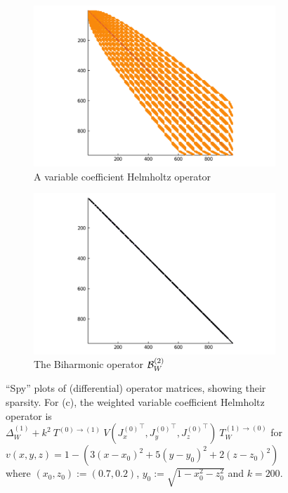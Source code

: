 \documentclass[11pt, oneside]{article}   	%
\begin{document}
\begin{figure}[t]
	\medskip
	\begin{subfigure}{0.45\textwidth}
		\includegraphics[scale=0.3]{sparsity-of-helmholtz}
		\centering
		\caption{A variable coefficient Helmholtz operator}
	\end{subfigure}\hfil %
	\begin{subfigure}{0.45\textwidth}
		\includegraphics[scale=0.3]{sparsity-of-biharmonic}
		\centering
		\caption{The Biharmonic operator $\mathcal{B}_W^{(2)}$} 
	\end{subfigure}\hfil %
	\caption{\enquote{Spy} plots of (differential) operator matrices, showing their sparsity. For (c), the weighted variable coefficient Helmholtz operator is $\Delta^{(1)}_W + k^2 \: T^{(0)\to(1)} \: V({J_x^{(0)}}^\top, {J_y^{(0)}}^\top, {J_z^{(0)}}^\top) \: T_W^{(1)\to(0)}$ for $v(x,y,z) = 1 - (3(x-x_0)^2 + 5(y-y_0)^2 + 2(z-z_0)^2)$ where $(x_0, z_0) := (0.7, 0.2)$, $y_0 := \sqrt{1 - x_0^2 - z_0^2}$ and $k = 200$.}
	\label{fig:sparsity}
\end{figure}
\end{document}
